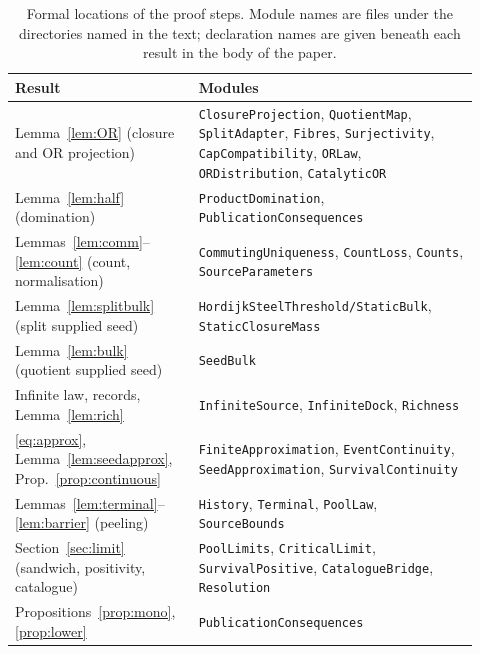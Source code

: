 \documentclass[11pt,a4paper]{article}
\theoremstyle{plain}
\theoremstyle{definition}
\theoremstyle{remark}
\begin{document}
\begin{table}[ht]
\centering\small
\caption{Formal locations of the proof steps. Module names are files under the directories named in the text; declaration names are given beneath each result in the body of the paper.}
\label{tab:formal}
\begin{tabular}{>{\raggedright\arraybackslash}p{0.34\linewidth}>{\raggedright\arraybackslash}p{0.58\linewidth}}
\toprule
Result & Modules\\
\midrule
Lemma~\ref{lem:OR} (closure and OR projection) & \texttt{ClosureProjection}, \texttt{QuotientMap}, \texttt{SplitAdapter}, \texttt{Fibres}, \texttt{Surjectivity}, \texttt{CapCompatibility}, \texttt{ORLaw}, \texttt{ORDistribution}, \texttt{CatalyticOR}\\
Lemma~\ref{lem:half} (domination) & \texttt{ProductDomination}, \texttt{PublicationConsequences}\\
Lemmas~\ref{lem:comm}--\ref{lem:count} (count, normalisation) & \texttt{CommutingUniqueness}, \texttt{CountLoss}, \texttt{Counts}, \texttt{SourceParameters}\\
Lemma~\ref{lem:splitbulk} (split supplied seed) & \texttt{HordijkSteelThreshold/StaticBulk}, \texttt{StaticClosureMass}\\
Lemma~\ref{lem:bulk} (quotient supplied seed) & \texttt{SeedBulk}\\
Infinite law, records, Lemma~\ref{lem:rich} & \texttt{InfiniteSource}, \texttt{InfiniteDock}, \texttt{Richness}\\
\eqref{eq:approx}, Lemma~\ref{lem:seedapprox}, Prop.~\ref{prop:continuous} & \texttt{FiniteApproximation}, \texttt{EventContinuity}, \texttt{SeedApproximation}, \texttt{SurvivalContinuity}\\
Lemmas~\ref{lem:terminal}--\ref{lem:barrier} (peeling) & \texttt{History}, \texttt{Terminal}, \texttt{PoolLaw}, \texttt{SourceBounds}\\
Section~\ref{sec:limit} (sandwich, positivity, catalogue) & \texttt{PoolLimits}, \texttt{CriticalLimit}, \texttt{SurvivalPositive}, \texttt{CatalogueBridge}, \texttt{Resolution}\\
Propositions~\ref{prop:mono}, \ref{prop:lower} & \texttt{PublicationConsequences}\\
\bottomrule
\end{tabular}
\end{table}
\end{document}
